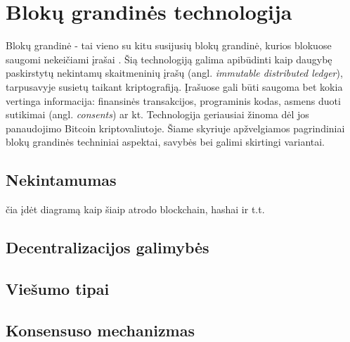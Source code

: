 \section{Blokų grandinės technologija}

Blokų grandinė - tai vieno su kitu susijusių blokų grandinė, kurios blokuose saugomi
nekeičiami įrašai \cite{SatoshiNakamoto}. Šią technologiją galima apibūdinti kaip daugybę paskirstytų nekintamų skaitmeninių įrašų 
(angl. \textit{immutable distributed ledger}), tarpusavyje susietų taikant kriptografiją. Įrašuose gali būti saugoma bet kokia vertinga informacija:
finansinės transakcijos, programinis kodas, asmens duoti sutikimai (angl. \textit{consents}) ar kt. Technologija geriausiai žinoma dėl jos panaudojimo Bitcoin kriptovaliutoje.
Šiame skyriuje apžvelgiamos pagrindiniai blokų grandinės techniniai aspektai, savybės bei galimi skirtingi variantai.

\subsection{Nekintamumas}

čia įdėt diagramą kaip šiaip atrodo blockchain, hashai ir t.t.

\subsection{Decentralizacijos galimybės}

\subsection{Viešumo tipai}

\subsection{Konsensuso mechanizmas}